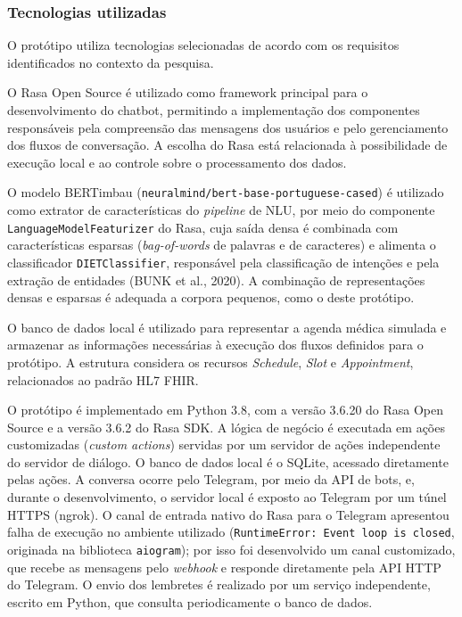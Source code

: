 \documentclass[12pt,a4paper]{extarticle}
\begin{document}
\subsubsection{Tecnologias utilizadas}

O protótipo utiliza tecnologias selecionadas de acordo com os requisitos identificados no contexto da pesquisa.

O Rasa Open Source é utilizado como framework principal para o desenvolvimento do chatbot, permitindo a implementação dos componentes responsáveis pela compreensão das mensagens dos usuários e pelo gerenciamento dos fluxos de conversação. A escolha do Rasa está relacionada à possibilidade de execução local e ao controle sobre o processamento dos dados.

O modelo BERTimbau (\texttt{neuralmind/\allowbreak bert-base-\allowbreak portuguese-cased}) é utilizado como extrator de características do \textit{pipeline} de NLU, por meio do componente \texttt{LanguageModel\allowbreak{}Featurizer} do Rasa, cuja saída densa é combinada com características esparsas (\textit{bag-of-words} de palavras e de caracteres) e alimenta o classificador \texttt{DIETClassifier}, responsável pela classificação de intenções e pela extração de entidades (BUNK et al., 2020). A combinação de representações densas e esparsas é adequada a corpora pequenos, como o deste protótipo.

O banco de dados local é utilizado para representar a agenda médica simulada e armazenar as informações necessárias à execução dos fluxos definidos para o protótipo. A estrutura considera os recursos \textit{Schedule}, \textit{Slot} e \textit{Appointment}, relacionados ao padrão HL7 FHIR.

O protótipo é implementado em Python 3.8, com a versão 3.6.20 do Rasa Open Source e a versão 3.6.2 do Rasa SDK. A lógica de negócio é executada em ações customizadas (\textit{custom actions}) servidas por um servidor de ações independente do servidor de diálogo. O banco de dados local é o SQLite, acessado diretamente pelas ações. A conversa ocorre pelo Telegram, por meio da API de bots, e, durante o desenvolvimento, o servidor local é exposto ao Telegram por um túnel HTTPS (ngrok). O canal de entrada nativo do Rasa para o Telegram apresentou falha de execução no ambiente utilizado (\texttt{RuntimeError: Event loop is closed}, originada na biblioteca \texttt{aiogram}); por isso foi desenvolvido um canal customizado, que recebe as mensagens pelo \textit{webhook} e responde diretamente pela API HTTP do Telegram. O envio dos lembretes é realizado por um serviço independente, escrito em Python, que consulta periodicamente o banco de dados.
\end{document}

